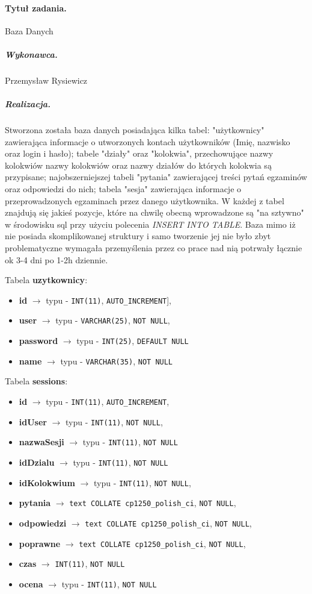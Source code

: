 \documentclass[a4paper]{article}
\begin{document}
\paragraph{Tytuł zadania.} Baza Danych
\subparagraph{Wykonawca.} Przemysław Rysiewicz
\subparagraph{Realizacja.} Stworzona została baza danych posiadająca kilka tabel:  "użytkownicy" zawierająca informacje o utworzonych kontach użytkowników (Imię, nazwisko oraz login i  hasło); tabele "działy" oraz "kolokwia", przechowujące nazwy kolokwiów nazwy kolokwiów oraz nazwy działów do których kolokwia są przypisane; najobszerniejszej tabeli "pytania" zawierającej treści pytań egzaminów oraz odpowiedzi do nich; tabela "sesja" zawierająca informacje o przeprowadzonych egzaminach przez danego użytkownika. 
W każdej z tabel znajdują się jakieś pozycje, które na chwilę obecną wprowadzone są "na sztywno" w środowisku sql przy użyciu polecenia \emph{INSERT INTO TABLE}. Baza mimo iż nie posiada skomplikowanej struktury i samo tworzenie jej nie było zbyt problematyczne wymagała przemyślenia przez co prace nad nią potrwały łącznie ok 3-4 dni po 1-2h dziennie. 


	\vspace{0.5cm}
	Tabela \textbf{uzytkownicy}:
	\begin{itemize}
		\item \textbf{id} $\to$ typu - \verb|INT(11)|, \verb|AUTO_INCREMENT|],
		\item \textbf{user} $\to$ typu - \verb|VARCHAR(25)|, \verb|NOT NULL|,
		\item \textbf{password} $\to$ typu - \verb|INT(25)|, \verb|DEFAULT NULL| 
		\item \textbf{name} $\to$ typu - \verb|VARCHAR(35)|, \verb|NOT NULL| 
	\end{itemize}
	
		\vspace{0.5cm}
		Tabela \textbf{sessions}:
		\begin{itemize}
			\item \textbf{id} $\to$ typu - \verb|INT(11)|, \verb|AUTO_INCREMENT|,
			\item \textbf{idUser} $\to$ typu - \verb|INT(11)|, \verb|NOT NULL|,
			\item \textbf{nazwaSesji} $\to$ typu - \verb|INT(11)|, \verb|NOT NULL| 
			\item \textbf{idDzialu} $\to$ typu - \verb|INT(11)|, \verb|NOT NULL| 
			\item \textbf{idKolokwium} $\to$ typu - \verb|INT(11)|, \verb|NOT NULL|,
			\item \textbf{pytania} $\to$  \verb|text COLLATE cp1250_polish_ci|, \verb|NOT NULL|,
			\item \textbf{odpowiedzi} $\to$  \verb|text COLLATE cp1250_polish_ci|, \verb|NOT NULL|,
			\item \textbf{poprawne} $\to$  \verb|text COLLATE cp1250_polish_ci|, \verb|NOT NULL|,
			\item \textbf{czas} $\to$  \verb|INT(11)|, \verb|NOT NULL| 
			\item \textbf{ocena} $\to$ typu - \verb|INT(11)|, \verb|NOT NULL| 
		\end{itemize}
		
\end{document}
